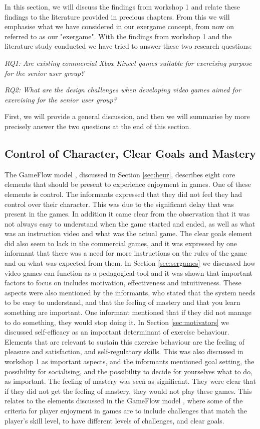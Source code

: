 In this section, we will discuss the findings from workshop 1 and relate these findings to the literature provided in precious chapters. From this we will emphasise what we have considered in our exergame concept, from now on referred to as our "exergame". With the findings from workshop 1 and the literature study conducted we have tried to answer these two research questions: 

\emph{RQ1: Are existing commercial Xbox Kinect games suitable for exercising purpose for the senior user group?}

\emph{RQ2: What are the design challenges when developing video games aimed for exercising for the senior user group?}

First, we will provide a general discussion, and then we will summarise by more precisely answer the two questions at the end of this section. 

\subsection{Control of Character, Clear Goals and Mastery}
The GameFlow model \cite{sweetser}, discussed in Section \ref{sec:heur}, describes eight core elements that should be present to experience enjoyment in games. One of these elements is control. The informants expressed that they did not feel they had control over their character. This was due to the significant delay that was present in the games. In addition it came clear from the observation that it was not always easy to understand when the game started and ended, as well as what was an instruction video and what was the actual game. The clear goals element did also seem to lack in the commercial games, and it was expressed by one informant that there was a need for more instructions on the rules of the game and on what was expected from them. In Section \ref{sec:sergames} we discussed how video games can function as a pedagogical tool and it was shown that important factors to focus on includes motivation, effectiveness and intuitiveness. These aspects were also mentioned by the informants, who stated that the system needs to be easy to understand, and that the feeling of mastery and that you learn something are important. One informant mentioned that if they did not manage to do something, they would stop doing it. In Section \ref{sec:motivators} we discussed self-efficacy as an important determinant of exercise behaviour. Elements that are relevant to sustain this exercise behaviour are the feeling of pleasure and satisfaction, and self-regulatory skills. This was also discussed in workshop 1 as important aspects, and the informants mentioned goal setting, the possibility for socialising, and the possibility to decide for yourselves what to do, as important. The feeling of mastery was seen as significant. They were clear that if they did not get the feeling of mastery, they would not play these games. This relates to the elements discussed in the GameFlow model \cite{sweetser}, where some of the criteria for player enjoyment in games are to include challenges that match the player's skill level, to have different levels of challenges, and clear goals. 

